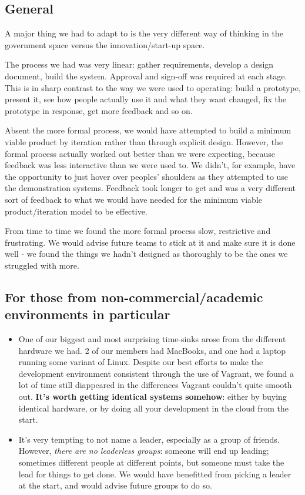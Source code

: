 \documentclass[12pt,a4paper,twosided]{article}
\begin{document}
\subsection{General}

A major thing we had to adapt to is the very different way of thinking
in the government space versus the innovation/start-up space.

The process we had was very linear: gather requirements, develop a
design document, build the system. Approval and sign-off was required at
each stage. This is in sharp contrast to the way we were used to
operating: build a prototype, present it, see how people actually use it
and what they want changed, fix the prototype in response, get more
feedback and so on.

Absent the more formal process, we would have attempted to build a
minimum viable product by iteration rather than through explicit design.
However, the formal process actually worked out better than we were
expecting, because feedback was less interactive than we were used to.
We didn't, for example, have the opportunity to just hover over peoples'
shoulders as they attempted to use the demonstration systems. Feedback
took longer to get and was a very different sort of feedback to what we
would have needed for the minimum viable product/iteration model to be
effective.

From time to time we found the more formal process slow, restrictive and
frustrating. We would advise future teams to stick at it and make sure
it is done well - we found the things we hadn't designed as thoroughly
to be the ones we struggled with more.

\subsection{For those from non-commercial/academic environments in
particular}

\begin{itemize}
\item
  One of our biggest and most surprising time-sinks arose from the
  different hardware we had. 2 of our members had MacBooks, and one had
  a laptop running some variant of Linux. Despite our best efforts to
  make the development environment consistent through the use of
  Vagrant, we found a lot of time still diappeared in the differences
  Vagrant couldn't quite smooth out. \textbf{It's worth getting
  identical systems somehow}: either by buying identical hardware, or by
  doing all your development in the cloud from the start.
\item
  It's very tempting to not name a leader, especially as a group of
  friends. However, \emph{there are no leaderless groups}: someone will
  end up leading; sometimes different people at different points, but
  someone must take the lead for things to get done. We would have
  benefitted from picking a leader at the start, and would advise future
  groups to do so.
\end{itemize}
\end{document}
